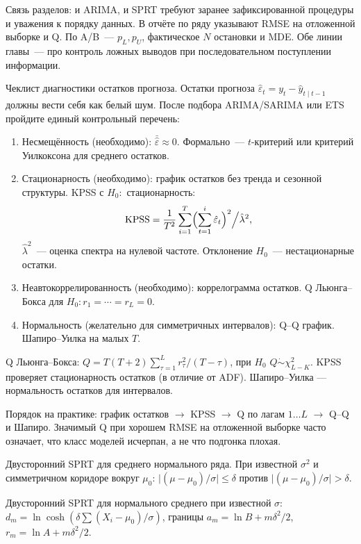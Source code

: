 Связь разделов: и ARIMA, и SPRT требуют заранее зафиксированной процедуры и уважения к порядку данных. В отчёте по ряду указывают RMSE на отложенной выборке и Q. По A/B~--- $p_L,p_U$, фактическое $N$ остановки и MDE. Обе линии главы~--- про контроль ложных выводов при последовательном поступлении информации.

Чеклист диагностики остатков прогноза. Остатки прогноза $\hat\varepsilon_t=y_t-\hat y_{t\mid t-1}$ должны вести себя как белый шум. После подбора ARIMA/SARIMA или ETS пройдите единый контрольный перечень:

\begin{enumerate}
  \item Несмещённость (необходимо): $\bar{\hat\varepsilon}\approx 0$.
        Формально~--- $t$-критерий или критерий Уилкоксона для среднего остатков.
  \item Стационарность (необходимо): график остатков без тренда
        и сезонной структуры. KPSS с $H_0\colon$ стационарность: \[ \mathrm{KPSS}=\frac{1}{T^2}\sum_{i=1}^T\Bigl(\sum_{t=1}^i\hat\varepsilon_t\Bigr)^2\Big/\hat\lambda^2, \] $\hat\lambda^2$~--- оценка спектра на нулевой частоте. Отклонение $H_0$~--- нестационарные остатки.
  \item Неавтокоррелированность (необходимо): коррелограмма остатков.
        Q Льюнга--Бокса для $H_0\colon r_1=\cdots=r_L=0$.
  \item Нормальность (желательно для симметричных интервалов):
        Q--Q график. Шапиро--Уилка на малых $T$.
\end{enumerate}

Q Льюнга--Бокса: $Q=T(T+2)\sum_{\tau=1}^L r_\tau^2/(T-\tau)$, при $H_0$ $Q\dot\sim\chi^2_{L-K}$. KPSS проверяет стационарность остатков (в отличие от ADF). Шапиро--Уилка --- нормальность остатков для интервалов.

Порядок на практике: график остатков $\to$ KPSS $\to$ Q по лагам $1\ldots L$ $\to$ Q--Q и Шапиро. Значимый Q при хорошем RMSE на отложенной выборке часто означает, что класс моделей исчерпан, а не что подгонка плохая.

Двусторонний SPRT для среднего нормального ряда. При известной $\sigma^2$ и симметричном коридоре вокруг $\mu_0$: $\bigl|(\mu-\mu_0)/\sigma\bigr|\leq\delta$ против $\bigl|(\mu-\mu_0)/\sigma\bigr|>\delta$.

Двусторонний SPRT для нормального среднего при известной $\sigma$: $d_m=\ln\cosh(\delta\sum(X_i-\mu_0)/\sigma)$, границы $a_m=\ln B+m\delta^2/2$, $r_m=\ln A+m\delta^2/2$.

